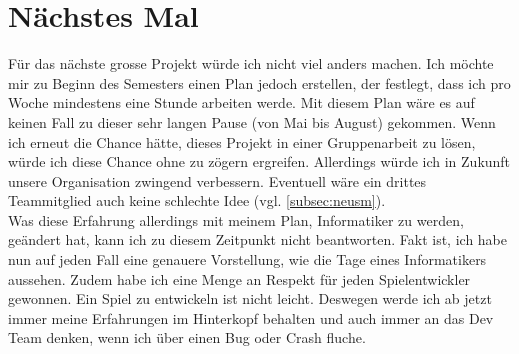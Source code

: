 \section{Nächstes Mal}
Für das nächste grosse Projekt würde ich nicht viel anders machen. Ich möchte mir zu Beginn des Semesters einen Plan jedoch erstellen, der festlegt, dass ich pro Woche mindestens eine Stunde arbeiten werde. Mit diesem Plan wäre es auf keinen Fall zu dieser sehr langen
Pause (von Mai bis August) gekommen. Wenn ich erneut die Chance hätte, dieses Projekt in einer Gruppenarbeit zu lösen, würde ich diese Chance ohne zu zögern ergreifen. Allerdings würde ich in Zukunft
unsere Organisation zwingend verbessern. Eventuell wäre ein drittes Teammitglied auch keine schlechte Idee (vgl. \autoref{subsec:neusm}).\\
Was diese Erfahrung allerdings mit meinem Plan, Informatiker zu werden, geändert hat, kann ich zu diesem Zeitpunkt nicht beantworten. Fakt ist, ich habe nun auf jeden Fall eine genauere Vorstellung,
wie die Tage eines Informatikers aussehen. Zudem habe ich eine Menge an Respekt für jeden Spielentwickler gewonnen. Ein Spiel zu entwickeln ist nicht leicht. Deswegen werde ich ab jetzt immer meine Erfahrungen im Hinterkopf
behalten und auch immer an das Dev Team denken, wenn ich über einen Bug oder Crash fluche.